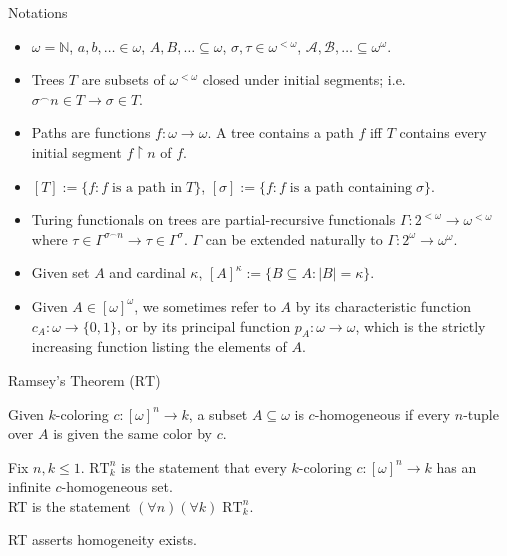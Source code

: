 \begin{frame}{Notations}
  \begin{itemize}
    \item $\omega=\mathbb{N}$, $a,b,\ldots\in\omega$,
      $A,B,\ldots\subseteq\omega$, $\sigma,\tau\in\omega^{<\omega}$,
      $\mathcal{A},\mathcal{B},\ldots\subseteq\omega^\omega$.
    \item Trees $T$ are subsets of $\omega^{<\omega}$ closed under initial
      segments; i.e. $\sigma^{\frown}n\in T \rightarrow \sigma\in T$.
    \item Paths are functions $f:\omega\rightarrow\omega$. A tree contains
      a path $f$ iff $T$ contains every initial segment $f\restriction n$
      of $f$.
    \item $[T] :=\{f:f\; \text{is a path in}\; T\}$, $[\sigma]:=\{f:f\;
      \text{is a path containing}\; \sigma\}$.
    \item Turing functionals on trees are partial-recursive functionals
      $\Gamma:2^{<\omega}\rightarrow\omega^{<\omega}$ where
      $\tau\in\Gamma^{\sigma^\frown n} \rightarrow
      \tau\in\Gamma^{\sigma}$. $\Gamma$ can be extended naturally to
      $\Gamma:2^\omega\rightarrow\omega^{\omega}$.
    \item Given set $A$ and cardinal $\kappa$, $[A]^\kappa
      :=\{B\subseteq A: |B|=\kappa\}$.
    \item Given $A\in[\omega]^\omega$, we sometimes refer to $A$ by its
      characteristic function $c_A:\omega\rightarrow\{0,1\}$, or by its
      principal function $p_A:\omega\rightarrow\omega$, which is the
      strictly increasing function listing the elements of $A$.
  \end{itemize}
\end{frame}

\begin{frame}{Ramsey's Theorem ($\text{RT}$)}
  \begin{define*}[$c$-homogeneous]
    Given $k$-coloring $c:[\omega]^n\rightarrow k$, a subset
    $A\subseteq\omega$ is $c$-homogeneous if every $n$-tuple over $A$ is
    given the same color by $c$.
  \end{define*}

  \vspace{1em}
  \begin{thm*}
    Fix $n,k\leq1$. $\text{RT}_k^n$ is the statement that every $k$-coloring
    $c:[\omega]^n\rightarrow k$ has an infinite $c$-homogeneous set.\\
    RT is the statement $(\forall n)(\forall k)\; \text{RT}_k^n$.
  \end{thm*}

  \vspace{1em}
  RT asserts homogeneity exists.
\end{frame}

